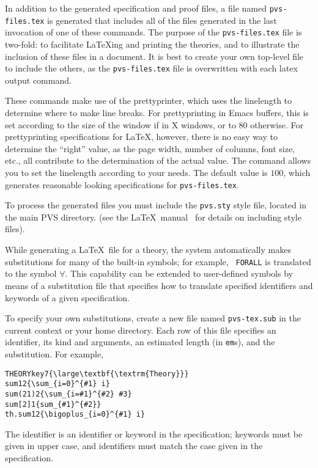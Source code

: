 In addition to the generated specification and proof files, a file named
\texttt{pvs-files.tex} is generated that includes all of the files
generated in the last invocation of one of these commands.  The purpose of
the {\tt pvs-files.tex} file is two-fold: to facilitate \LaTeX ing and
printing the theories, and to illustrate the inclusion of these files in a
document.  It is best to create your own top-level file to include the
others, as the \texttt{pvs-files.tex} file is overwritten with each latex
output command.

These commands make use of the prettyprinter, which uses the linelength to
determine where to make line breaks.  For prettyprinting in Emacs buffers,
this is set according to the size of the window if in X windows, or to
$80$ otherwise.  For prettyprinting specifications for \LaTeX, however,
there is no easy way to determine the ``right'' value, as the page width,
number of columns, font size, etc., all contribute to the determination of
the actual value.  The  command allows you to
set the linelength according to your needs.  The default value is $100$,
which generates reasonable looking specifications for
\texttt{pvs-files.tex}.

To process the generated files you must include the \texttt{pvs.sty}
style file, located in the main PVS directory. (see the \LaTeX\
manual~\cite{latex2e} for details on including style files).  

While generating a \LaTeX\ file for a theory, the system automatically
makes substitutions for many of the built-in symbols; for example, {\tt
FORALL} is translated to the symbol $\forall$.  This capability can be
extended to user-defined symbols by means of a substitution file that
specifies how to translate specified identifiers and keywords of a given
specification.

To specify your own substitutions, create a new file named
\texttt{pvs-tex.sub} in the current context or your home directory.  Each
row of this file specifies an identifier, its kind and arguments, an
estimated length (in \texttt{em}s), and the substitution.  For example,
{\small\begin{alltt}
  THEORY key 7 \verb|{\large\textbf{\textrm{Theory}}}|
  sum 1 2 \verb|{\sum_{i=0}^{#1} i}|
  sum (2 1) 2 \verb|{\sum_{i=#1}^{#2} #3}|
  sum [2] 1 \verb|{sum_{#1}^{#2}}|
  th.sum 1 2 \verb|{\bigoplus_{i=0}^{#1} i}|
\end{alltt}}
The identifier is an identifier or keyword in the specification;
keywords must be given in upper case, and identifiers must match the
case given in the specification.

